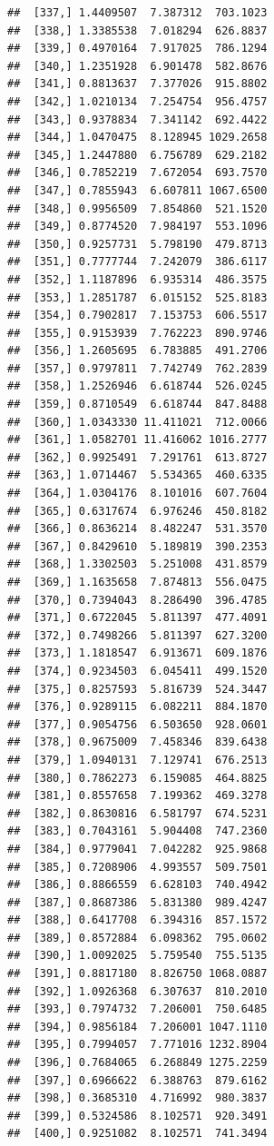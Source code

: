 \documentclass[article]{jss}\usepackage[]{graphicx}\usepackage[]{xcolor}
\makeatletter
\newenvironment{kframe}{%
 \def\at@end@of@kframe{}%
 \ifinner\ifhmode%
  \def\at@end@of@kframe{\end{minipage}}%
  \begin{minipage}{\columnwidth}%
 \fi\fi%
 \def\FrameCommand##1{\hskip\@totalleftmargin \hskip-\fboxsep
 \colorbox{shadecolor}{##1}\hskip-\fboxsep
     \hskip-\linewidth \hskip-\@totalleftmargin \hskip\columnwidth}%
 \MakeFramed {\advance\hsize-\width
   \@totalleftmargin\z@ \linewidth\hsize
   \@setminipage}}%
 {\par\unskip\endMakeFramed%
 \at@end@of@kframe}
\newenvironment{knitrout}{}{} %
\makeatother
\begin{document}
\begin{knitrout}
\begin{kframe}
\begin{verbatim}
##  [337,] 1.4409507  7.387312  703.1023
##  [338,] 1.3385538  7.018294  626.8837
##  [339,] 0.4970164  7.917025  786.1294
##  [340,] 1.2351928  6.901478  582.8676
##  [341,] 0.8813637  7.377026  915.8802
##  [342,] 1.0210134  7.254754  956.4757
##  [343,] 0.9378834  7.341142  692.4422
##  [344,] 1.0470475  8.128945 1029.2658
##  [345,] 1.2447880  6.756789  629.2182
##  [346,] 0.7852219  7.672054  693.7570
##  [347,] 0.7855943  6.607811 1067.6500
##  [348,] 0.9956509  7.854860  521.1520
##  [349,] 0.8774520  7.984197  553.1096
##  [350,] 0.9257731  5.798190  479.8713
##  [351,] 0.7777744  7.242079  386.6117
##  [352,] 1.1187896  6.935314  486.3575
##  [353,] 1.2851787  6.015152  525.8183
##  [354,] 0.7902817  7.153753  606.5517
##  [355,] 0.9153939  7.762223  890.9746
##  [356,] 1.2605695  6.783885  491.2706
##  [357,] 0.9797811  7.742749  762.2839
##  [358,] 1.2526946  6.618744  526.0245
##  [359,] 0.8710549  6.618744  847.8488
##  [360,] 1.0343330 11.411021  712.0066
##  [361,] 1.0582701 11.416062 1016.2777
##  [362,] 0.9925491  7.291761  613.8727
##  [363,] 1.0714467  5.534365  460.6335
##  [364,] 1.0304176  8.101016  607.7604
##  [365,] 0.6317674  6.976246  450.8182
##  [366,] 0.8636214  8.482247  531.3570
##  [367,] 0.8429610  5.189819  390.2353
##  [368,] 1.3302503  5.251008  431.8579
##  [369,] 1.1635658  7.874813  556.0475
##  [370,] 0.7394043  8.286490  396.4785
##  [371,] 0.6722045  5.811397  477.4091
##  [372,] 0.7498266  5.811397  627.3200
##  [373,] 1.1818547  6.913671  609.1876
##  [374,] 0.9234503  6.045411  499.1520
##  [375,] 0.8257593  5.816739  524.3447
##  [376,] 0.9289115  6.082211  884.1870
##  [377,] 0.9054756  6.503650  928.0601
##  [378,] 0.9675009  7.458346  839.6438
##  [379,] 1.0940131  7.129741  676.2513
##  [380,] 0.7862273  6.159085  464.8825
##  [381,] 0.8557658  7.199362  469.3278
##  [382,] 0.8630816  6.581797  674.5231
##  [383,] 0.7043161  5.904408  747.2360
##  [384,] 0.9779041  7.042282  925.9868
##  [385,] 0.7208906  4.993557  509.7501
##  [386,] 0.8866559  6.628103  740.4942
##  [387,] 0.8687386  5.831380  989.4247
##  [388,] 0.6417708  6.394316  857.1572
##  [389,] 0.8572884  6.098362  795.0602
##  [390,] 1.0092025  5.759540  755.5135
##  [391,] 0.8817180  8.826750 1068.0887
##  [392,] 1.0926368  6.307637  810.2010
##  [393,] 0.7974732  7.206001  750.6485
##  [394,] 0.9856184  7.206001 1047.1110
##  [395,] 0.7994057  7.771016 1232.8904
##  [396,] 0.7684065  6.268849 1275.2259
##  [397,] 0.6966622  6.388763  879.6162
##  [398,] 0.3685310  4.716992  980.3837
##  [399,] 0.5324586  8.102571  920.3491
##  [400,] 0.9251082  8.102571  741.3494

\end{verbatim}
\end{kframe}
\end{knitrout}
\end{document}
